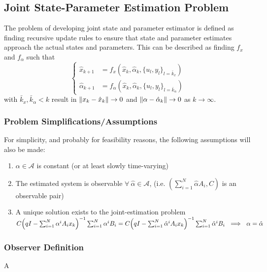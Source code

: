 \documentclass[]{article}
\begin{document}
\newpage
\subsection{Joint State-Parameter Estimation Problem}
The problem of developing joint state and parameter estimator is defined as finding recursive update rules to ensure that state and parameter estimates approach the actual states and parameters. This can be described as finding $f_x$ and $f_\alpha$ such that
\begin{equation}\label{eq:est_pblm_statement}
	\begin{cases}
		\hat{x}_{k+1} 		&= f_x(\hat{x}_k, \hat{\alpha}_k, \{u_l, y_l\}_{l=\bar{k}_x})\\
		\hat{\alpha}_{k+1} 	&= f_\alpha(\hat{x}_k, \hat{\alpha}_k, \{u_l, y_l\}_{l=\bar{k}_\alpha})
	\end{cases}
\end{equation}
with $\bar{k}_x, \bar{k}_\alpha < k$ result in $\norm{x_k - \hat{x}_k} \to 0$ and $\norm{\alpha - \hat{\alpha}_k} \to 0$ as $k \to \infty$.

\subsubsection{Problem Simplifications/Assumptions \cite{beelen2017joint}}
For simplicity, and probably for feasibility reasons, the following assumptions will also be made:

\begin{enumerate}
	\item $\alpha \in \mathcal{A}$ is constant (or at least slowly time-varying)
	\item The estimated system is observable $\forall \ \hat{\alpha} \in \mathcal{A}$, (i.e. $(\sum_{i=1}^N \hat{\alpha} A_i, C)$ is an observable pair)
	\item A unique solution exists to the joint-estimation problem\\
		$C \qty(q I - \sum_{i=1}^{N} \alpha^i A_i x_k)^{-1} \sum_{i=1}^N \alpha^i B_i = C \qty(q I - \sum_{i=1}^{N} \hat{\alpha}^i A_i x_k)^{-1} \sum_{i=1}^N \hat{\alpha}^i B_i \ \implies \ \alpha = \hat{\alpha}$
\end{enumerate}

\subsubsection{Observer Definition}
A 
\end{document}
